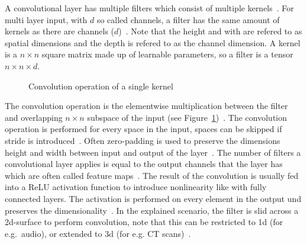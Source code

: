 A convolutional layer has multiple filters which consist of multiple
kernels~\citep{chauhan_review_2018}.
For multi layer input, with $d$ so called channels, a filter has the same amount of kernels as there
are channels ($d$)~\citep{ponti_everything_2017}.
Note that the height and with are refered to as spatial dimensions and the depth is refered to as
the channel dimension.
A kernel is a $n\times n$ square matrix made up of learnable parameters, so a filter is a tensor
$n\times n\times d$.
\begin{figure}[ht]
    \centering
    
    \caption[Visualization of a convolution operation]{%
        Convolution operation of a single kernel~\citep{chauhan_review_2018}\label{fig:conv-layer}
    }
\end{figure}
The convolution operation is the elementwise multiplication between the filter and overlapping
$n\times n$ subspace of the input (see Figure~\ref{fig:conv-layer})~\citep{ponti_everything_2017}.
The convolution operation is performed for every space in the input, spaces can be skipped if
stride is introduced~\citep{ponti_everything_2017}.
Often zero-padding is used to preserve the dimensions height and width between input and output of
the layer~\citep{ponti_everything_2017}.
The number of filters a convolutional layer applies is equal to the output channels that the layer
has which are often called feature maps~\citep{ponti_everything_2017}.
The result of the convolution is usually fed into a ReLU activation function to introduce
nonlinearity like with fully connected layers.
The activation is performed on every element in the output und preserves the
dimensionality~\citep{ponti_everything_2017}.
In the explained scenario, the filter is slid across a 2d-surface to perform convolution, note that
this can be restricted to 1d (for e.g.\ audio), or extended to 3d (for e.g. CT
scans)~\citep{goodfellow_deep_2016}.

